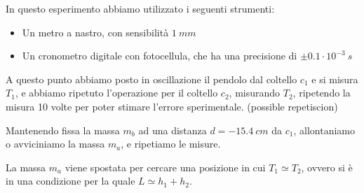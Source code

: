 In questo esperimento abbiamo utilizzato i seguenti strumenti:
\begin{itemize}
  \item Un metro a nastro, con sensibilità $1\ mm$
  \item Un cronometro digitale con fotocellula, che ha una precisione di $\pm 0.1 \cdot 10^{-3}\ s$
\end{itemize}

A questo punto abbiamo posto in oscillazione il pendolo dal coltello $c_1$ e si misura $T_1$, e abbiamo ripetuto l'operazione per il coltello $c_2$, misurando $T_2$, ripetendo la misura 10 volte per poter stimare l'errore sperimentale. (possible repetiscion)

Mantenendo fissa la massa $m_b$ ad una distanza $d = -15.4\ cm$ da $c_1$, allontaniamo o avviciniamo la massa $m_a$, e ripetiamo le misure.

La massa $m_a$ viene spostata per cercare una posizione in cui $T_1 \simeq T_2$, ovvero si è in una condizione per la quale $L\simeq h_1+h_2$. 

